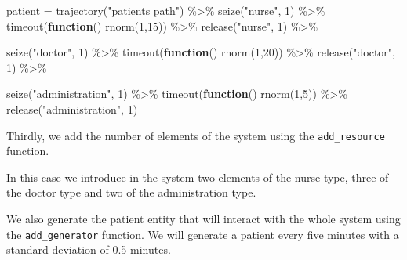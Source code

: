 \documentclass[
]{book}
\newenvironment{Shaded}{\begin{snugshade}}{\end{snugshade}}
\newcommand{\ControlFlowTok}[1]{\textcolor[rgb]{0.13,0.29,0.53}{\textbf{#1}}}
\newcommand{\DecValTok}[1]{\textcolor[rgb]{0.00,0.00,0.81}{#1}}
\newcommand{\FunctionTok}[1]{\textcolor[rgb]{0.00,0.00,0.00}{#1}}
\newcommand{\NormalTok}[1]{#1}
\newcommand{\OtherTok}[1]{\textcolor[rgb]{0.56,0.35,0.01}{#1}}
\newcommand{\SpecialCharTok}[1]{\textcolor[rgb]{0.00,0.00,0.00}{#1}}
\newcommand{\StringTok}[1]{\textcolor[rgb]{0.31,0.60,0.02}{#1}}
\theoremstyle{definition}
\theoremstyle{definition}
\theoremstyle{definition}
\theoremstyle{definition}
\theoremstyle{remark}
\begin{document}
\begin{Shaded}
\begin{Highlighting}[]
\NormalTok{patient }\OtherTok{=} \FunctionTok{trajectory}\NormalTok{(}\StringTok{"patients path"}\NormalTok{) }\SpecialCharTok{\%\textgreater{}\%}
  \FunctionTok{seize}\NormalTok{(}\StringTok{"nurse"}\NormalTok{, }\DecValTok{1}\NormalTok{) }\SpecialCharTok{\%\textgreater{}\%}
  \FunctionTok{timeout}\NormalTok{(}\ControlFlowTok{function}\NormalTok{() }\FunctionTok{rnorm}\NormalTok{(}\DecValTok{1}\NormalTok{,}\DecValTok{15}\NormalTok{)) }\SpecialCharTok{\%\textgreater{}\%}
  \FunctionTok{release}\NormalTok{(}\StringTok{"nurse"}\NormalTok{, }\DecValTok{1}\NormalTok{) }\SpecialCharTok{\%\textgreater{}\%}
  
  \FunctionTok{seize}\NormalTok{(}\StringTok{"doctor"}\NormalTok{, }\DecValTok{1}\NormalTok{) }\SpecialCharTok{\%\textgreater{}\%}
  \FunctionTok{timeout}\NormalTok{(}\ControlFlowTok{function}\NormalTok{() }\FunctionTok{rnorm}\NormalTok{(}\DecValTok{1}\NormalTok{,}\DecValTok{20}\NormalTok{)) }\SpecialCharTok{\%\textgreater{}\%}
  \FunctionTok{release}\NormalTok{(}\StringTok{"doctor"}\NormalTok{, }\DecValTok{1}\NormalTok{) }\SpecialCharTok{\%\textgreater{}\%}
  
  \FunctionTok{seize}\NormalTok{(}\StringTok{"administration"}\NormalTok{, }\DecValTok{1}\NormalTok{) }\SpecialCharTok{\%\textgreater{}\%}
  \FunctionTok{timeout}\NormalTok{(}\ControlFlowTok{function}\NormalTok{() }\FunctionTok{rnorm}\NormalTok{(}\DecValTok{1}\NormalTok{,}\DecValTok{5}\NormalTok{)) }\SpecialCharTok{\%\textgreater{}\%}
  \FunctionTok{release}\NormalTok{(}\StringTok{"administration"}\NormalTok{, }\DecValTok{1}\NormalTok{)}
\end{Highlighting}
\end{Shaded}

Thirdly, we add the number of elements of the system using the \texttt{add\_resource} function.

In this case we introduce in the system two elements of the nurse type, three of the doctor type and two of the administration type.

We also generate the patient entity that will interact with the whole system using the \texttt{add\_generator} function. We will generate a patient every five minutes with a standard deviation of 0.5 minutes.
\end{document}
